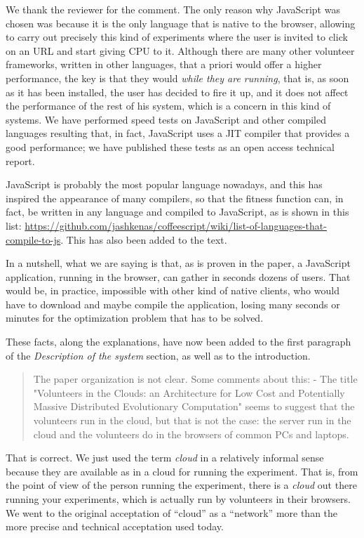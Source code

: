 \documentclass[preprint]{elsarticle}
\begin{document}
We thank the reviewer for the comment. The only reason why JavaScript
was chosen was because it is the only language that is native to the
browser, allowing to carry out precisely this kind of experiments
where the user is invited to click on an URL and start giving CPU to
it. Although there are many other volunteer frameworks, written in
other languages, that a priori would offer a higher performance, the
key is that they would {\em while they are running}, that is, as soon
as it has been installed, the user has decided to fire it up, and it
does not affect the performance of the rest of his system, which is a %
concern in this kind of systems. We have performed speed tests on
JavaScript and other compiled languages resulting that, in fact,
JavaScript uses a JIT compiler that provides a good performance; we
have published these tests as an open access technical report. \cite{2015arXiv151101088M}

JavaScript is probably the most popular language nowadays, and this
has inspired the appearance of many compilers, so that the fitness
function can, in fact, be written in any language and compiled to
JavaScript, as is shown in this list:
\url{https://github.com/jashkenas/coffeescript/wiki/list-of-languages-that-compile-to-js}. This
has also been added to the text.

In a nutshell, what we are saying is that, as is proven in the paper,
a JavaScript application, running in the browser, can gather in
seconds dozens of users. That would be, in practice, impossible with
other kind of native clients, who would have to download and maybe
compile the application, losing many seconds or minutes for the
optimization problem that has to be solved.

These facts, along the explanations, have now been added to the first
paragraph of the {\em Description of the system} section, as well as
to the introduction.

\begin{quote}
The paper organization is not clear. Some comments about this:
- The title "Volunteers in the Clouds: an Architecture for Low Cost and Potentially Massive Distributed
Evolutionary Computation" seems to suggest that the volunteers run in the cloud, but that is not the case:
the server run in the cloud and the volunteers do in the browsers of
common PCs and laptops.
\end{quote}

That is correct. We just used the term {\em cloud} in a relatively informal
sense because they are available as in a cloud for running the
experiment. That is, from the point of view of the person running the
experiment, there is a {\em cloud} out there running your experiments,
which is actually run by volunteers in their browsers. We went to the
original acceptation of ``cloud'' as a ``network'' more than the more
precise and technical acceptation used today. %
\end{document}
